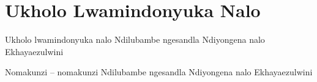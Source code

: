 \starttocol
\chapter{Ukholo Lwamindonyuka Nalo}
\nexttocol
\hfill{\it }
\stoptocol
\starttocol
\startlines
{\sc Ukholo} lwamindonyuka nalo
Ndilubambe ngesandla
Ndiyongena nalo
Ekhayaezulwini
 
Nomakunzi -- nomakunzi
Ndilubambe ngesandla
Ndiyongena nalo
Ekhayaezulwini
\stoplines
\nexttocol

\stoptocol
